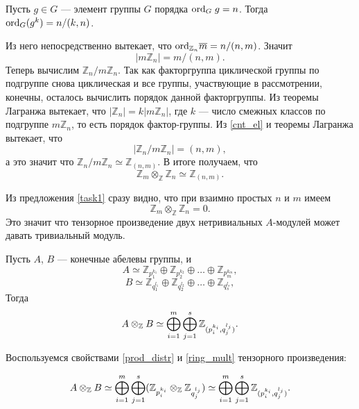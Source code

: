 \begin{Proof}
        \begin{Statement}
            \cite{Vinberg} Пусть $g \in G$ --- элемент группы $G$ порядка $\textup{ord}_G\;g = n$. Тогда $\textup{ord}_G(g^k) = n/(k, n)$.
        \end{Statement}
        Из него непосредственно вытекает, что $\textup{ord}_{\mathbb{Z}_n} \overline{m} = n / (n, m)$. Значит 
        \begin{equation} \label{cnt_el}
            |m\mathbb{Z}_n| = m / (n, m). 
        \end{equation}
        Теперь вычислим $\mathbb{Z}_n / m\mathbb{Z}_n$. Так как факторгруппа циклической группы по подгруппе снова циклическая и все группы, участвующие
        в рассмотрении, конечны, осталось вычислить порядок данной факторгруппы. Из теоремы Лагранжа вытекает, что $|\mathbb{Z}_n| = k|m\mathbb{Z}_n|$, где $k$ --- число смежных классов по
        подгруппе $m\mathbb{Z}_n$, то есть порядок фактор-группы. Из \eqref{cnt_el} и теоремы Лагранжа вытекает, что 
        \begin{equation*}
            |\mathbb{Z}_n / m\mathbb{Z}_n| = (n, m),
        \end{equation*}
        а это значит что $\mathbb{Z}_n / m\mathbb{Z}_n \simeq \mathbb{Z}_{(n, m)}$. В итоге получаем, что
        \begin{equation*}
            \mathbb{Z}_m \otimes_\mathbb{Z} \mathbb{Z}_n \simeq \mathbb{Z}_{(n, m)}.
        \end{equation*}
    \end{Proof}

    Из предложения \ref{task1} сразу видно, что при взаимно простых $n$ и $m$ имеем $$\mathbb{Z}_m \otimes_\mathbb{Z} \mathbb{Z}_n = 0.$$ Это значит что тензорное произведение
    двух нетривиальных $A$-модулей может давать тривиальный модуль.

    \begin{Proposal}
        Пусть $A$, $B$ --- конечные абелевы группы, и
        $$
            A \simeq \mathbb{Z}_{p_1^{k_1}} \oplus \mathbb{Z}_{p_2^{k_2}} \oplus \dots \oplus \mathbb{Z}_{p_m^{k_m}},
        $$
        $$
            B \simeq \mathbb{Z}_{q_1^{l_1}} \oplus \mathbb{Z}_{q_2^{l_2}} \oplus \dots \oplus \mathbb{Z}_{q_s^{l_s}},
        $$
        Тогда 
        $$A \otimes_{\mathbb{Z}} B \simeq \bigoplus_{i=1}^{m} \bigoplus_{j=1}^{s} \mathbb{Z}_{(p_i^{k_i}, q_j^{l_j})}.$$
    \end{Proposal}
    \begin{Proof}
        Воспользуемся свойствами \eqref{prod_distr} и \eqref{ring_mult} тензорного произведения:

        $$
        A \otimes_{\mathbb{Z}} B \simeq \bigoplus_{i=1}^{m} \bigoplus_{j=1}^{s} (\mathbb{Z}_{p_i^{k_i}} \otimes_{\mathbb{Z}} \mathbb{Z}_{q_j^{l_j}}) \simeq 
            \bigoplus_{i=1}^{m} \bigoplus_{j=1}^{s} \mathbb{Z}_{(p_i^{k_i}, q_j^{l_j})}.
        $$
    \end{Proof}

